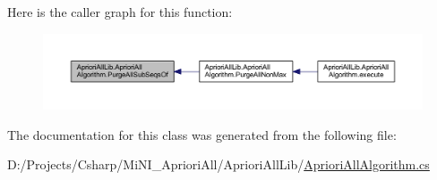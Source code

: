 Here is the caller graph for this function\-:
\nopagebreak
\begin{figure}[H]
\begin{center}
\leavevmode
\includegraphics[width=350pt]{class_apriori_all_lib_1_1_apriori_all_algorithm_a6a6e8aa1c43b3a71c2eb1d5e068d959a_icgraph}
\end{center}
\end{figure}




The documentation for this class was generated from the following file\-:\begin{DoxyCompactItemize}
\item 
D\-:/\-Projects/\-Csharp/\-Mi\-N\-I\-\_\-\-Apriori\-All/\-Apriori\-All\-Lib/\hyperlink{_apriori_all_algorithm_8cs}{Apriori\-All\-Algorithm.\-cs}\end{DoxyCompactItemize}
